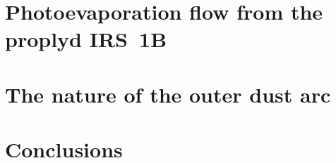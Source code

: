 \documentclass[useAMS, usenatbib, a4paper]{mnras}
\begin{document}
\section{Photoevaporation flow from the proplyd IRS~1B}
\label{sec:phot-flow-from}

\section{The nature of the outer dust arc}

\section{Conclusions}
\label{sec:conclusions}






\bsp	%
\label{lastpage}
\end{document}
